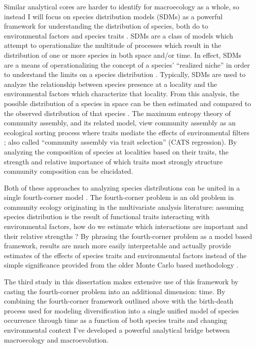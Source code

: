 Similar analytical cores are harder to identify for macroecology as a whole, so instead I will focus on species distribution models (SDMs) as a powerful framework for understanding the distribution of species, both do to environmental factors \citep{Elith2009} and species traits \citep{Shipley2006}. SDMs are a class of models which attempt to operationalize the multitude of processes which result in the distribution of one or more species in both space and/or time. In effect, SDMs are a means of operationalizing the concept of a species' ``realized niche'' in order to understand the limits on a species distribution \citep{Elith2009}. Typically, SDMs are used to analyze the relationship between species presence at a locality and the environmental factors which characterize that locality. From this analysis, the possible distribution of a species in space can be then estimated and compared to the observed distribution of that species \citep{Elith2009,Austin2006,Phillips2006a}. The maximum entropy theory of community assembly, and its related model, view community assembly as an ecological sorting process where traits mediate the effects of environmental filters \citep{Shipley2006,Warton2015a}; also called ``community assembly via trait selection'' (CATS regression). By analyzing the composition of species at localities based on their traits, the strength and relative importance of which traits most strongly structure community composition can be elucidated. 

Both of these approaches to analyzing species distributions can be united in a single fourth-corner model \citep{Warton2015a,Brown2014c}. The fourth-corner problem is an old problem in community ecology originating in the multivariate analysis literature: assuming species distribution is the result of functional traits interacting with environmental factors, how do we estimate which interactions are important and their relative strengths \citep{Legendre1997,Dray2008}? By phrasing the fourth-corner problem as a model based framework, results are much more easily interpretable and actually provide estimates of the effects of species traits and environmental factors instead of the simple significance provided from the older Monte Carlo based methodology \citep{Brown2014c,Jamil2013,Pollock2012,Pollock2015}.

The third study in this dissertation makes extensive use of this framework by casting the fourth-corner problem into an additional dimension: time. By combining the fourth-corner framework outlined above \citep{Warton2015a,Brown2014c} with the birth-death process used for modeling diversification into a single unified model of species occurrence through time as a function of both species traits and changing environmental context I've developed a powerful analytical bridge between macroecology and macroevolution.

